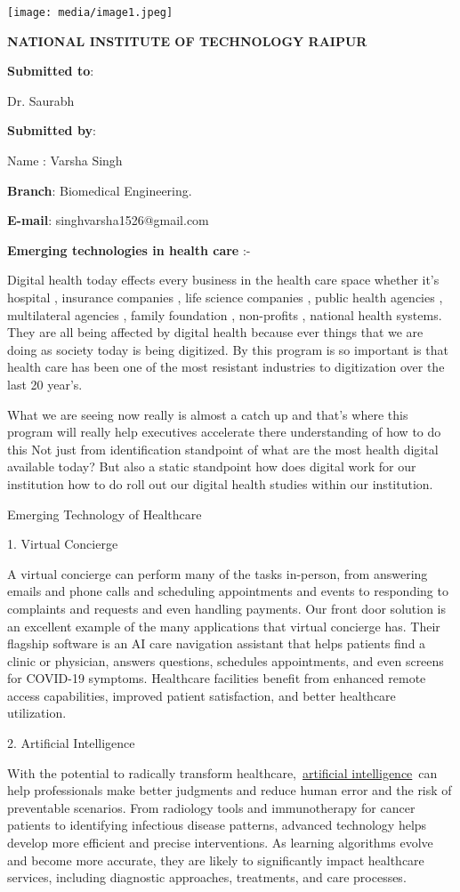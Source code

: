 \documentclass[
]{article}
\author{}
\date{}
\begin{document}
\texttt{[image: media/image1.jpeg]}

\textbf{NATIONAL INSTITUTE OF TECHNOLOGY RAIPUR}

\textbf{Submitted to}:

Dr. Saurabh

\textbf{Submitted by}:

Name : Varsha Singh

\textbf{Branch}: Biomedical Engineering.

\textbf{E-mail}: singhvarsha1526@gmail.com

\textbf{Emerging technologies in health care} :-

Digital health today effects every business in the health care space
whether it's hospital , insurance companies , life science companies ,
public health agencies , multilateral agencies , family foundation ,
non-profits , national health systems. They are all being affected by
digital health because ever things that we are doing as society today is
being digitized. By this program is so important is that health care has
been one of the most resistant industries to digitization over the last
20 year's.

What we are seeing now really is almost a catch up and that's where this
program will really help executives accelerate there understanding of
how to do this Not just from identification standpoint of what are the
most health digital available today? But also a static standpoint how
does digital work for our institution how to do roll out our digital
health studies within our institution.

Emerging Technology of Healthcare

1. Virtual Concierge

A virtual concierge can perform many of the tasks in-person, from
answering emails and phone calls and scheduling appointments and events
to responding to complaints and requests and even handling payments. Our
front door solution is an excellent example of the many applications
that virtual concierge has. Their flagship software is an AI care
navigation assistant that helps patients find a clinic or physician,
answers questions, schedules appointments, and even screens for COVID-19
symptoms. Healthcare facilities benefit from enhanced remote access
capabilities, improved patient satisfaction, and better healthcare
utilization.~

2. Artificial Intelligence

With the potential to radically transform
healthcare,~\href{https://gyant.com/products/}{artificial
intelligence}~can help professionals make better judgments and reduce
human error and the risk of preventable scenarios. From radiology tools
and immunotherapy for cancer patients to identifying infectious disease
patterns, advanced technology helps develop more efficient and precise
interventions. As learning algorithms evolve and become more accurate,
they are likely to significantly impact healthcare services, including
diagnostic approaches, treatments, and care processes.~~
\end{document}
